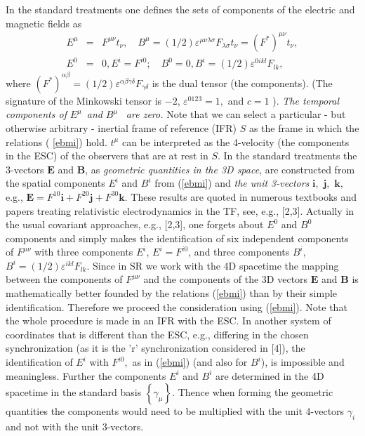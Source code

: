 \documentclass[a4paper,showpacs,preprintnumbers,amsmath,amssymb]{revtex4}
\begin{document}
In the standard treatments one defines the sets of components of the
electric and magnetic fields as
\begin{eqnarray}
E^{\mu } &=&F^{\mu \nu }t_{\nu },\quad B^{\mu }=(1/2)\varepsilon ^{\mu \nu
\lambda \sigma }F_{\lambda \sigma }t_{\nu }=(F^{\ast })^{\mu \nu }t_{\nu },
\nonumber \\
E^{0} &=&0,E^{i}=F^{i0};\quad B^{0}=0,B^{i}=(1/2)\varepsilon ^{0ikl}F_{lk},
\label{ebmi}
\end{eqnarray}
where $(F^{\ast })^{\alpha \beta }=(1/2)\varepsilon ^{\alpha \beta \gamma
\delta }F_{\gamma \delta }$ is the dual tensor (the components). (The
signature of the Minkowski tensor is $-2$, $\varepsilon ^{0123}=1,$ and $c=1$%
). \emph{The temporal components of }$E^{\mu }$\emph{\ and }$B^{\mu }$\emph{%
\ are zero. }Note that we can select a particular - but otherwise arbitrary
- inertial frame of reference (IFR) $S$ as the frame in which the relations (%
\ref{ebmi}) hold. $t^{\mu }$ can be interpreted as the 4-velocity (the
components in the ESC) of the observers that are at rest in $S$. In the
standard treatments the 3-vectors $\mathbf{E}$ and $\mathbf{B}$, as \emph{%
geometric quantities in the 3D space}, are constructed from the spatial
components $E^{i}$ and $B^{i}$ from (\ref{ebmi}) and \emph{the unit 3-vectors%
} $\mathbf{i},$ $\mathbf{j},$ $\mathbf{k,}$ e.g., $\mathbf{E=}F^{10}\mathbf{i%
}+F^{20}\mathbf{j}+F^{30}\mathbf{k.}$ These results are quoted in numerous
textbooks and papers treating relativistic electrodynamics in the TF, see,
e.g., [2,3]. Actually in the usual covariant approaches, e.g., [2,3], one
forgets about $E^{0}$ and $B^{0} $ components and simply makes the
identification of six independent components of $F^{\mu \nu }$ with three
components $E^{i}$, $E^{i}=F^{i0}$, and three components $B^{i}$, $%
B^{i}=(1/2)\varepsilon ^{ikl}F_{lk}.$ Since in SR we work with the 4D
spacetime the mapping between the components of $F^{\mu \nu }$ and the
components of the 3D vectors $\mathbf{E}$ and $\mathbf{B}$ is mathematically
better founded by the relations (\ref{ebmi}) than by their simple
identification. Therefore we proceed the consideration using (\ref{ebmi}).
Note that the whole procedure is made in an IFR with the ESC. In another
system of coordinates that is different than the ESC, e.g., differing in the
chosen synchronization (as it is the 'r' synchronization considered in [4]),
the identification of $E^{i}$ with $F^{i0},$ as in (\ref{ebmi}) (and also
for $B^{i}$), is impossible and meaningless. Further the components $E^{i}$
and $B^{i}$ are determined in the 4D spacetime in the standard basis $%
\left\{ \gamma _{\mu }\right\} .$ Thence when forming the geometric
quantities the components would need to be multiplied with the unit
4-vectors $\gamma _{i}$ and not with the unit 3-vectors.
\end{document}
